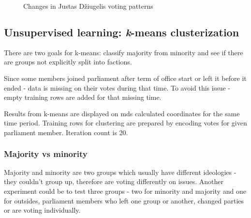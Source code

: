 \documentclass[a4paper,12pt]{article}
\begin{document}
\begin{figure}[!tbp]
		\hfill
		\hfill	
   		\caption{Changes in Justas Džiugelis voting patterns}
   		\label{fig:justas_all}
   	\end{figure}
   
   \clearpage
   	
   	\subsection{Unsupervised learning: {\textit k-means} clusterization }
   	
   		
   	There are two goals for \gls{k-means}: classify majority from minority and see if there are groups not explicitly split into factions.
   	
   	Since some members joined parliament after term of office start or left it before it ended - data is missing on their votes during that time. To avoid this issue - empty training rows are added for that missing time.
   	
	Results from \gls{k-means} are displayed on \acrshort{mds} calculated coordinates for the same time period. Training rows for clustering are prepared by encoding votes for given parliament member. Iteration count is 20.
	
	\subsubsection{Majority vs minority} 
	
	Majority and minority are two groups which usually have different ideologies - they couldn't group up, therefore are voting differently on issues. Another experiment could be to test three groups - two for minority and majority and one for outsides, parliament members who left one group or another, changed parties or are voting individually.
	
\end{document}
